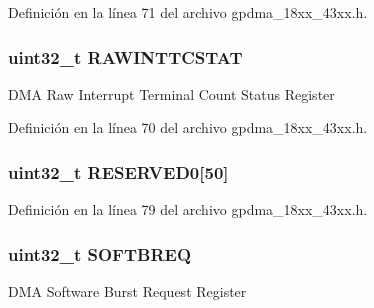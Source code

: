 Definición en la línea 71 del archivo gpdma\+\_\+18xx\+\_\+43xx.\+h.

\subsubsection[{\texorpdfstring{R\+A\+W\+I\+N\+T\+T\+C\+S\+T\+AT}{RAWINTTCSTAT}}]{ uint32\+\_\+t R\+A\+W\+I\+N\+T\+T\+C\+S\+T\+AT}\hypertarget{struct_l_p_c___g_p_d_m_a___t_a4daa613529d2cf0ff2eb1f2dc2c913fa}{}\label{struct_l_p_c___g_p_d_m_a___t_a4daa613529d2cf0ff2eb1f2dc2c913fa}
D\+MA Raw Interrupt Terminal Count Status Register 

Definición en la línea 70 del archivo gpdma\+\_\+18xx\+\_\+43xx.\+h.

\subsubsection[{\texorpdfstring{R\+E\+S\+E\+R\+V\+E\+D0}{RESERVED0}}]{ uint32\+\_\+t R\+E\+S\+E\+R\+V\+E\+D0\mbox{[}50\mbox{]}}\hypertarget{struct_l_p_c___g_p_d_m_a___t_a4769b8c1fb6ecb5670fd9fa9511002d3}{}\label{struct_l_p_c___g_p_d_m_a___t_a4769b8c1fb6ecb5670fd9fa9511002d3}


Definición en la línea 79 del archivo gpdma\+\_\+18xx\+\_\+43xx.\+h.

\subsubsection[{\texorpdfstring{S\+O\+F\+T\+B\+R\+EQ}{SOFTBREQ}}]{ uint32\+\_\+t S\+O\+F\+T\+B\+R\+EQ}\hypertarget{struct_l_p_c___g_p_d_m_a___t_aba54c67fd4ebe2a1b0753050a7d06581}{}\label{struct_l_p_c___g_p_d_m_a___t_aba54c67fd4ebe2a1b0753050a7d06581}
D\+MA Software Burst Request Register 

